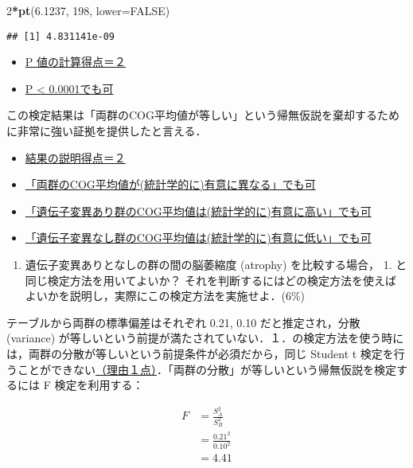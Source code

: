 \documentclass[11pt,]{problemset}
\newenvironment{Shaded}{\begin{snugshade}}{\end{snugshade}}
\newcommand{\DataTypeTok}[1]{\textcolor[rgb]{0.13,0.29,0.53}{#1}}
\newcommand{\DecValTok}[1]{\textcolor[rgb]{0.00,0.00,0.81}{#1}}
\newcommand{\FloatTok}[1]{\textcolor[rgb]{0.00,0.00,0.81}{#1}}
\newcommand{\KeywordTok}[1]{\textcolor[rgb]{0.13,0.29,0.53}{\textbf{#1}}}
\newcommand{\NormalTok}[1]{#1}
\newcommand{\OperatorTok}[1]{\textcolor[rgb]{0.81,0.36,0.00}{\textbf{#1}}}
\newcommand{\OtherTok}[1]{\textcolor[rgb]{0.56,0.35,0.01}{#1}}
\providecommand{\tightlist}{%
  \setlength{\itemsep}{0pt}\setlength{\parskip}{0pt}}
\begin{document}
\begin{Shaded}
\begin{Highlighting}[]
\DecValTok{2}\OperatorTok{*}\KeywordTok{pt}\NormalTok{(}\FloatTok{6.1237}\NormalTok{, }\DecValTok{198}\NormalTok{, }\DataTypeTok{lower=}\OtherTok{FALSE}\NormalTok{)}
\end{Highlighting}
\end{Shaded}

\begin{verbatim}
## [1] 4.831141e-09
\end{verbatim}

\begin{itemize}
\item
  \underline{P 値の計算得点＝２}
\item
  \underline{P < 0.0001でも可}
\end{itemize}

この検定結果は「両群のCOG平均値が等しい」という帰無仮説を棄却するために非常に強い証拠を提供したと言える．

\begin{itemize}
\item
  \underline{結果の説明得点＝２}
\item
  \underline{「両群のCOG平均値が(統計学的に)有意に異なる」でも可}
\item
  \underline{「遺伝子変異あり群のCOG平均値は(統計学的に)有意に高い」でも可}
\item
  \underline{「遺伝子変異なし群のCOG平均値は(統計学的に)有意に低い」でも可}
\end{itemize}

\begin{enumerate}
\def\labelenumi{\arabic{enumi}.}
\setcounter{enumi}{1}
\tightlist
\item
  遺伝子変異ありとなしの群の間の脳萎縮度 (atrophy) を比較する場合， 1.
  と同じ検定方法を用いてよいか？
  それを判断するにはどの検定方法を使えばよいかを説明し，実際にこの検定方法を実施せよ．(6\%)
\end{enumerate}

テーブルから両群の標準偏差はそれぞれ 0.21, 0.10 だと推定され，分散
(variance)
が等しいという前提が満たされていない．１．の検定方法を使う時には，両群の分散が等しいという前提条件が必須だから，同じ
Student t
検定を行うことができない\underline{（理由１点）}．「両群の分散」が等しいという帰無仮説を検定するには
F 検定を利用する：

\[
\begin{aligned}
F & = \frac{S^2_A}{S^2_B} \\
  & = \frac{0.21^2}{0.10^2} \\
  & = 4.41
\end{aligned}
\]
\end{document}
